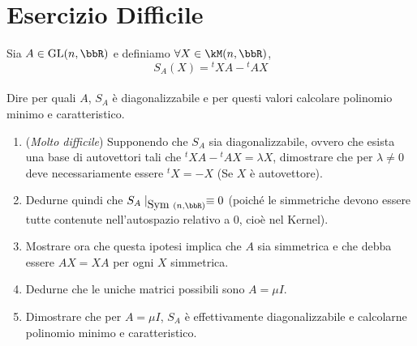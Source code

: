 \documentclass[a4paper,NoNotes,GeneralMath]{stdmdoc}
\begin{document}
	\section*{Esercizio Difficile}
	Sia $A \in \GL(n, \bbR)$ e definiamo $\forall X \in \kM(n,\bbR)$, $$ S_A(X) = {}^tXA - {}^tAX $$ \\
	Dire per quali $A$, $S_A$ è diagonalizzabile e per questi valori calcolare polinomio minimo e caratteristico.
	\begin{enumerate}
		\item ({\it Molto difficile}) Supponendo che $S_A$ sia diagonalizzabile, ovvero che esista una base di autovettori tali che ${}^tXA - {}^tAX = \lambda X$, dimostrare che per $\lambda \neq 0$ deve necessariamente essere ${}^tX = -X$ (Se $X$ è autovettore).
		\item Dedurne quindi che $S_A\mid_{\Symm(n,\bbR)} \equiv 0$ (poiché le simmetriche devono essere tutte contenute nell'autospazio relativo a $0$, cioè nel Kernel).
		\item Mostrare ora che questa ipotesi implica che $A$ sia simmetrica e che debba essere $AX = XA$ per ogni $X$ simmetrica.
		\item Dedurne che le uniche matrici possibili sono $A = \mu I$.
		\item Dimostrare che per $A = \mu I$, $S_A$ è effettivamente diagonalizzabile e calcolarne polinomio minimo e caratteristico.
	\end{enumerate}
\end{document}
